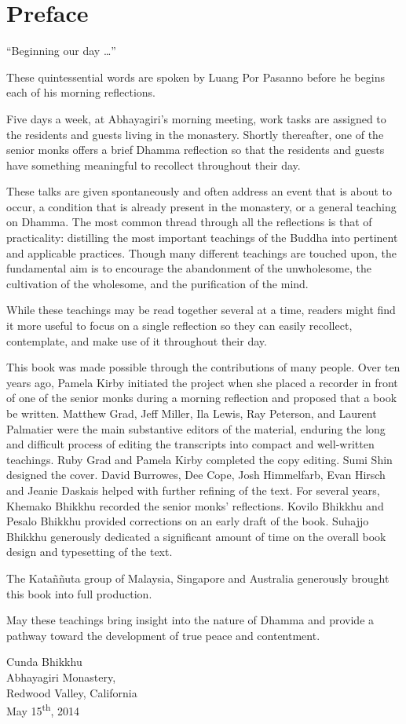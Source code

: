 \chapter{Preface}

``Beginning our day \ldots{}''

These quintessential words are spoken by Luang Por Pasanno before he
begins each of his morning reflections.

Five days a week, at Abhayagiri's morning meeting, work tasks are
assigned to the residents and guests living in the monastery. Shortly
thereafter, one of the senior monks offers a brief Dhamma reflection so
that the residents and guests have something meaningful to recollect
throughout their day.

These talks are given spontaneously and often address an event that is
about to occur, a condition that is already present in the monastery, or
a general teaching on Dhamma. The most common thread through all the
reflections is that of practicality: distilling the most important
teachings of the Buddha into pertinent and applicable practices. Though
many different teachings are touched upon, the fundamental aim is to
encourage the abandonment of the unwholesome, the cultivation of the
wholesome, and the purification of the mind.

While these teachings may be read together several at a time, readers
might find it more useful to focus on a single reflection so they can
easily recollect, contemplate, and make use of it throughout their day.

This book was made possible through the contributions of many people.
Over ten years ago, Pamela Kirby initiated the project when she placed a
recorder in front of one of the senior monks during a morning reflection
and proposed that a book be written. Matthew Grad, Jeff Miller, Ila
Lewis, Ray Peterson, and Laurent Palmatier were the main
substantive editors of the material, enduring the long and difficult
process of editing the transcripts into compact and well-written
teachings. Ruby Grad and Pamela Kirby completed the copy editing. Sumi
Shin designed the cover. David Burrowes, Dee Cope, Josh Himmelfarb, Evan
Hirsch and Jeanie Daskais helped with further refining of the text. For
several years, Khemako Bhikkhu recorded the senior monks' reflections.
Kovilo Bhikkhu and Pesalo Bhikkhu provided corrections on an early draft
of the book. Suhajjo Bhikkhu generously dedicated a significant amount
of time on the overall book design and typesetting of the text.

The Kataññuta group of Malaysia, Singapore and Australia generously
brought this book into full production.

May these teachings bring insight into the nature of Dhamma and provide
a pathway toward the development of true peace and contentment.

\vspace{15pt}\noindent Cunda Bhikkhu\\
Abhayagiri Monastery,\\
Redwood Valley, California\\
May 15\textsuperscript{th}, 2014
